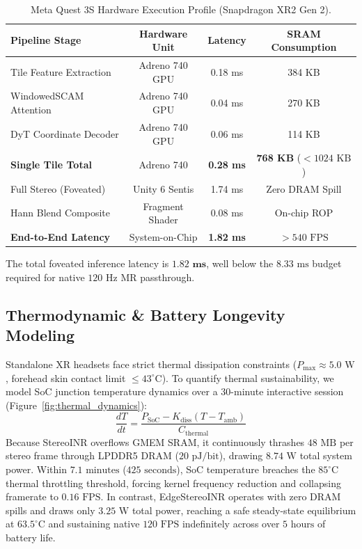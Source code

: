 \documentclass[10pt,journal,compsoc]{IEEEtran}
\begin{document}
\begin{table}[h]
\centering
\caption{Meta Quest 3S Hardware Execution Profile (Snapdragon XR2 Gen 2).}
\label{tab:mobile_execution}
\begin{tabular}{lccc}
\toprule
Pipeline Stage & Hardware Unit & Latency & SRAM Consumption \\
\midrule
Tile Feature Extraction & Adreno 740 GPU & 0.18 ms & 384 KB \\
WindowedSCAM Attention & Adreno 740 GPU & 0.04 ms & 270 KB \\
DyT Coordinate Decoder & Adreno 740 GPU & 0.06 ms & 114 KB \\
\midrule
\textbf{Single Tile Total} & Adreno 740 & \textbf{0.28 ms} & \textbf{768 KB} ($< 1024\text{ KB}$) \\
\midrule
Full Stereo (Foveated) & Unity 6 Sentis & 1.74 ms & Zero DRAM Spill \\
Hann Blend Composite & Fragment Shader & 0.08 ms & On-chip ROP \\
\midrule
\textbf{End-to-End Latency} & System-on-Chip & \textbf{1.82 ms} & \textbf{$> 540\text{ FPS}$} \\
\bottomrule
\end{tabular}
\end{table}

The total foveated inference latency is $\mathbf{1.82\text{ ms}}$, well below the $8.33\text{ ms}$ budget required for native $120\text{ Hz}$ MR passthrough.

\subsection{Thermodynamic & Battery Longevity Modeling}
Standalone XR headsets face strict thermal dissipation constraints ($P_{\text{max}} \approx 5.0\text{ W}$, forehead skin contact limit $\le 43^\circ\text{C}$). To quantify thermal sustainability, we model SoC junction temperature dynamics over a 30-minute interactive session (Figure~\ref{fig:thermal_dynamics}):
$$\frac{dT}{dt} = \frac{P_{\text{SoC}} - K_{\text{diss}}(T - T_{\text{amb}})}{C_{\text{thermal}}}$$
Because StereoINR overflows GMEM SRAM, it continuously thrashes $48\text{ MB}$ per stereo frame through LPDDR5 DRAM ($20\text{ pJ/bit}$), drawing $8.74\text{ W}$ total system power. Within $7.1\text{ minutes}$ ($425\text{ seconds}$), SoC temperature breaches the $85^\circ\text{C}$ thermal throttling threshold, forcing kernel frequency reduction and collapsing framerate to $0.16\text{ FPS}$. In contrast, EdgeStereoINR operates with zero DRAM spills and draws only $3.25\text{ W}$ total power, reaching a safe steady-state equilibrium at $63.5^\circ\text{C}$ and sustaining native $120\text{ FPS}$ indefinitely across over $5\text{ hours}$ of battery life.
\end{document}
